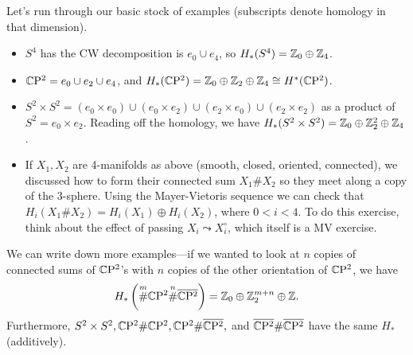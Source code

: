 \begin{example}
    Let's run through our basic stock of examples (subscripts denote homology in that dimension).
    \begin{itemize}
    \setlength\itemsep{-.2em}
\item $S^4$ has the CW decomposition is $e_0 \cup e_4$, so $H_*(S^4) = \mathbb{Z}_0 \oplus \mathbb{Z}_4$.
\item $\mathbb{C}\mathrm{P}^2 = e_0 \cup  e_2 \cup  e_4$, and $H_*(\mathbb{C}\mathrm{P}^2)= \mathbb{Z}_0 \oplus \mathbb{Z}_2 \oplus \mathbb{Z}_4 \cong H^*(\mathbb{C}\mathrm{P}^2)$.
\item $S^2 \times S^2 = (e_0 \times e_0)\cup (e_0 \times  e_2) \cup (e_2 \times e_0) \cup  (e_2 \times e_2) $ as a product of $S^2 = e_0 \times  e_2$. Reading off the homology, we have $H_*(S^2 \times  S^2) = \mathbb{Z}_0 \oplus \mathbb{Z}_2^2 \oplus \mathbb{Z}_4$.
\item If $X_1,X_2$ are 4-manifolds as above (smooth, closed, oriented, connected), we discussed how to form their connected sum $X_1 \# X_2$ so they meet along a copy of the 3-sphere. Using the Mayer-Vietoris sequence we can check that $H_i (X_1 \# X_2) = H_i (X_1) \oplus H_i (X_2)$, where $0<i<4$. To do this exercise, think about the effect of passing $X_i \leadsto X_i ^{\circ }$, which itself is a MV exercise.
    \end{itemize}
    We can write down more examples---if we wanted to look at $n$ copies of connected sums of $\mathbb{C} \mathrm{P}^2$'s with $n$ copies of the other orientation of $\mathbb{C}\mathrm{P}^2$, we have \[
        H_*\left( \overset{m}{\#} \mathbb{C}\mathrm{P}^2 \overset{n}{\#} \overline{\mathbb{C} \mathrm{P}^2} \right)  = \mathbb{Z}_0\oplus \mathbb{Z}_2 ^{m+n}\oplus \mathbb{Z}.
    \] Furthermore, $S^2 \times S^2, \mathbb{C} \mathrm{P}^2 \# \mathbb{C} \mathrm{P}^2, \mathbb{C} \mathrm{P}^2 \# \overline{\mathbb{C} \mathrm{P}^2},$ and $ \overline{\mathbb{C} \mathrm{P}^2} \#   \overline{\mathbb{C} \mathrm{P}^2}$ have the same $H_*$ (additively). 
\end{example}
